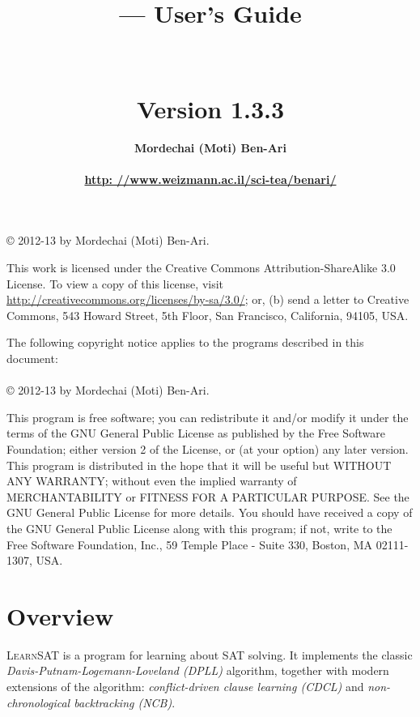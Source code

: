 \documentclass[11pt]{article}
\title{\bfseries \ls{} --- User's Guide\\\mbox{}\\\mbox{}\\
\bfseries\normalsize Version 1.3.3}
\author{\bfseries Mordechai (Moti) Ben-Ari\\\mbox{}\\
\url{http: //www.weizmann.ac.il/sci-tea/benari/}}
\newcommand*{\ls}{\textsc{LearnSAT}}
\begin{document}
\maketitle

\thispagestyle{empty}

\vspace*{\fill}

\begin{center}
\copyright{} 2012-13 by Mordechai (Moti) Ben-Ari.
\end{center}
This work is licensed under the Creative Commons Attribution-ShareAlike 3.0
License. To view a copy of this license, visit
\url{http://creativecommons.org/licenses/by-sa/3.0/}; or, (b) send a letter
to Creative Commons, 543 Howard Street, 5th Floor, San Francisco,
California, 94105, USA.

\bigskip\bigskip

 
\begin{center}
The following copyright notice applies to the programs described in this
document:\mbox{}\\\mbox{}\\
\copyright{} 2012-13 by Mordechai (Moti) Ben-Ari.
\end{center}

This program is free software; you can redistribute it and/or
modify it under the terms of the GNU General Public License
as published by the Free Software Foundation; either version 2
of the License, or (at your option) any later version.
This program is distributed in the hope that it will be useful
but WITHOUT ANY WARRANTY; without even the implied warranty of
MERCHANTABILITY or FITNESS FOR A PARTICULAR PURPOSE.
See the GNU General Public License for more details.
You should have received a copy of the GNU General Public License
along with this program; if not, write to the Free Software
Foundation, Inc., 59 Temple Place - Suite 330, Boston, MA
02111-1307, USA.

\setcounter{page}{0}
\newpage

\section{Overview}

\ls{} is a program for learning about SAT solving. It implements the
classic \emph{Davis-Putnam-Logemann-Loveland (DPLL)} algorithm, together
with modern extensions of the algorithm: \emph{conflict-driven clause
learning (CDCL)} and \emph{non-chronological backtracking (NCB)}.
\end{document}
